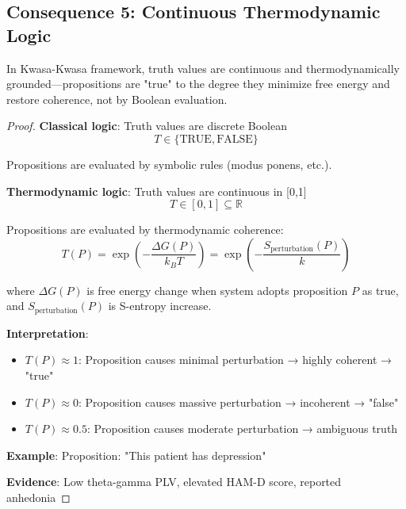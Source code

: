 \subsection{Consequence 5: Continuous Thermodynamic Logic}

\begin{theorem}
\label{thm:thermodynamic_truth}
In Kwasa-Kwasa framework, truth values are continuous and thermodynamically grounded—propositions are "true" to the degree they minimize free energy and restore coherence, not by Boolean evaluation.
\end{theorem}

\begin{proof}
\textbf{Classical logic}: Truth values are discrete Boolean
\begin{equation}
T \in \{\text{TRUE}, \text{FALSE}\}
\end{equation}

Propositions are evaluated by symbolic rules (modus ponens, etc.).

\textbf{Thermodynamic logic}: Truth values are continuous in [0,1]
\begin{equation}
T \in [0, 1] \subseteq \mathbb{R}
\end{equation}

Propositions are evaluated by thermodynamic coherence:
\begin{equation}
T(P) = \exp\left(-\frac{\Delta G(P)}{k_B T}\right) = \exp\left(-\frac{S_{\text{perturbation}}(P)}{k}\right)
\end{equation}

where $\Delta G(P)$ is free energy change when system adopts proposition $P$ as true, and $S_{\text{perturbation}}(P)$ is S-entropy increase.

\textbf{Interpretation}:
\begin{itemize}
\item $T(P) \approx 1$: Proposition causes minimal perturbation → highly coherent → "true"
\item $T(P) \approx 0$: Proposition causes massive perturbation → incoherent → "false"
\item $T(P) \approx 0.5$: Proposition causes moderate perturbation → ambiguous truth
\end{itemize}

\textbf{Example}: Proposition: "This patient has depression"

\textbf{Evidence}: Low theta-gamma PLV, elevated HAM-D score, reported anhedonia


\end{proof}
